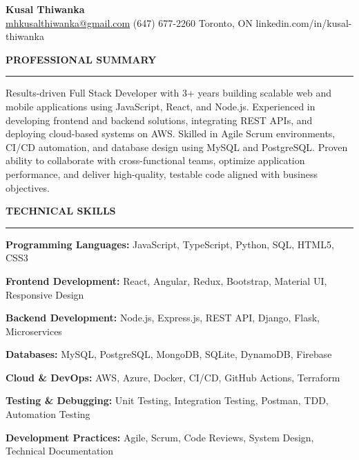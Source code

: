 \documentclass[10pt,letterpaper]{article}
\begin{document}
\begin{center}
{\LARGE\textbf{Kusal Thiwanka}}\\[3pt]
\href{mailto:mhkusalthiwanka@gmail.com}{mhkusalthiwanka@gmail.com}\hspace{2em}%
(647) 677{-}2260\hspace{2em}%
Toronto, ON\hspace{2em}
linkedin.com/in/kusal-thiwanka
\end{center}

\vspace{6pt}

\textbf{PROFESSIONAL SUMMARY}\\[-8pt]
\noindent\rule{\textwidth}{1pt}

\vspace{-2pt}

Results-driven Full Stack Developer with 3+ years building scalable web and mobile applications using JavaScript, React, and Node.js. Experienced in developing frontend and backend solutions, integrating REST APIs, and deploying cloud-based systems on AWS. Skilled in Agile Scrum environments, CI/CD automation, and database design using MySQL and PostgreSQL. Proven ability to collaborate with cross-functional teams, optimize application performance, and deliver high-quality, testable code aligned with business objectives.

\vspace{8pt}

\textbf{TECHNICAL SKILLS}\\[-8pt]
\noindent\rule{\textwidth}{1pt}

\vspace{-2pt}

\textbf{Programming Languages:} JavaScript, TypeScript, Python, SQL, HTML5, CSS3

\textbf{Frontend Development:} React, Angular, Redux, Bootstrap, Material UI, Responsive Design

\textbf{Backend Development:} Node.js, Express.js, REST API, Django, Flask, Microservices

\textbf{Databases:} MySQL, PostgreSQL, MongoDB, SQLite, DynamoDB, Firebase

\textbf{Cloud \& DevOps:} AWS, Azure, Docker, CI/CD, GitHub Actions, Terraform

\textbf{Testing \& Debugging:} Unit Testing, Integration Testing, Postman, TDD, Automation Testing

\textbf{Development Practices:} Agile, Scrum, Code Reviews, System Design, Technical Documentation
\end{document}

